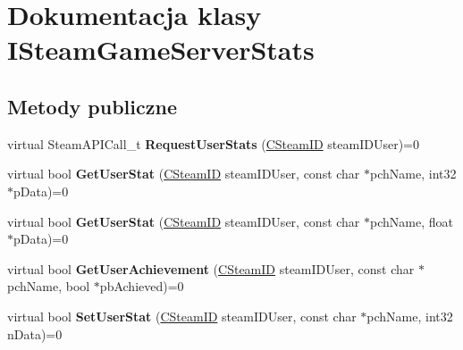 \hypertarget{class_i_steam_game_server_stats}{}\section{Dokumentacja klasy I\+Steam\+Game\+Server\+Stats}
\label{class_i_steam_game_server_stats}
\subsection*{Metody publiczne}
\begin{DoxyCompactItemize}
\item 
\mbox{\label{class_i_steam_game_server_stats_aa26cc575764280c12b452c6dda4dc33d}} 
virtual Steam\+A\+P\+I\+Call\+\_\+t {\bfseries Request\+User\+Stats} (\hyperlink{class_c_steam_i_d}{C\+Steam\+ID} steam\+I\+D\+User)=0
\item 
\mbox{\label{class_i_steam_game_server_stats_a745c30c85cd1282d25f2cca2646a5d60}} 
virtual bool {\bfseries Get\+User\+Stat} (\hyperlink{class_c_steam_i_d}{C\+Steam\+ID} steam\+I\+D\+User, const char $\ast$pch\+Name, int32 $\ast$p\+Data)=0
\item 
\mbox{\label{class_i_steam_game_server_stats_ae37220e5cbd22b43644a8b2fd6cbfda1}} 
virtual bool {\bfseries Get\+User\+Stat} (\hyperlink{class_c_steam_i_d}{C\+Steam\+ID} steam\+I\+D\+User, const char $\ast$pch\+Name, float $\ast$p\+Data)=0
\item 
\mbox{\label{class_i_steam_game_server_stats_ae5f352ac462b7829df350a15effce7ce}} 
virtual bool {\bfseries Get\+User\+Achievement} (\hyperlink{class_c_steam_i_d}{C\+Steam\+ID} steam\+I\+D\+User, const char $\ast$pch\+Name, bool $\ast$pb\+Achieved)=0
\item 
\mbox{\label{class_i_steam_game_server_stats_a5646a2191e05907f4d7ab3a89a648197}} 
virtual bool {\bfseries Set\+User\+Stat} (\hyperlink{class_c_steam_i_d}{C\+Steam\+ID} steam\+I\+D\+User, const char $\ast$pch\+Name, int32 n\+Data)=0
\item 
\mbox{\label{class_i_steam_game_server_stats_ac20f928e3fdf37e0772856bebb71c4d1}} 

\end{DoxyCompactItemize}
